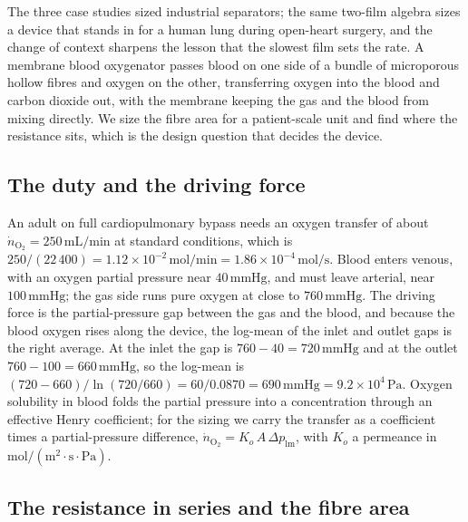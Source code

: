 The three case studies sized industrial separators; the same two-film
algebra sizes a device that stands in for a human lung during open-heart
surgery, and the change of context sharpens the lesson that the slowest
film sets the rate. A membrane blood oxygenator passes blood on one side
of a bundle of microporous hollow fibres and oxygen on the other,
transferring oxygen into the blood and carbon dioxide out, with the
membrane keeping the gas and the blood from mixing directly. We size the
fibre area for a patient-scale unit and find where the resistance sits,
which is the design question that decides the device.

\subsection*{The duty and the driving force}

An adult on full cardiopulmonary bypass needs an oxygen transfer of about
$\dot n_{\text{O}_2} = 250\,\text{mL/min}$ at standard conditions, which is
$250/(22\,400) = 1.12\times 10^{-2}\,\text{mol/min} = 1.86\times 10^{-4}\,
\text{mol/s}$. Blood enters venous, with an oxygen partial pressure near
$40\,\text{mmHg}$, and must leave arterial, near $100\,\text{mmHg}$; the
gas side runs pure oxygen at close to $760\,\text{mmHg}$. The driving force
is the partial-pressure gap between the gas and the blood, and because the
blood oxygen rises along the device, the log-mean of the inlet and outlet
gaps is the right average. At the inlet the gap is $760-40 = 720\,\text{
mmHg}$ and at the outlet $760-100 = 660\,\text{mmHg}$, so the log-mean is
$(720-660)/\ln(720/660) = 60/0.0870 = 690\,\text{mmHg} = 9.2\times 10^{4}
\,\text{Pa}$. Oxygen solubility in blood folds the partial pressure into a
concentration through an effective Henry coefficient; for the sizing we
carry the transfer as a coefficient times a partial-pressure difference,
$\dot n_{\text{O}_2} = K_o\,A\,\Delta p_{\text{lm}}$, with $K_o$ a
permeance in $\text{mol}/(\text{m}^2\cdot\text{s}\cdot\text{Pa})$.

\subsection*{The resistance in series and the fibre area}

